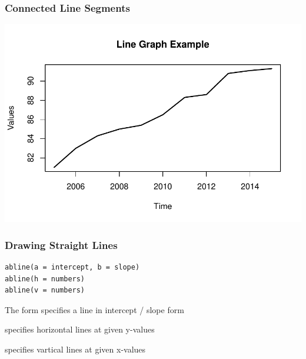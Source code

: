 \documentclass[12pt]{beamer}\usepackage[]{graphicx}\usepackage[]{color}
\newenvironment{knitrout}{}{} %
\begin{document}

\begin{frame}[fragile]
\frametitle{Connected Line Segments}
\begin{knitrout}\scriptsize
{}\color{fgcolor}

{\centering \includegraphics[width=.8\linewidth,height=.6\linewidth]{figure/line_segs-1} 

}



\end{knitrout}
\end{frame}


\begin{frame}[fragile]
\frametitle{Drawing Straight Lines}

\begin{verbatim}
abline(a = intercept, b = slope)
abline(h = numbers)
abline(v = numbers)
\end{verbatim}

\bi
  \item The  form specifies a line in intercept / slope form
  \item {} specifies horizontal lines at given y-values
  \item {} specifies vartical lines at given x-values
\ei

\end{frame}

\end{document}
